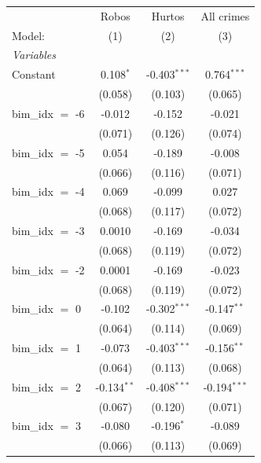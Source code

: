 
\begingroup
\centering
\begin{tabular}{lccc}
   \tabularnewline \midrule \midrule
                       & Robos          & Hurtos         & All crimes \\   
   Model:              & (1)            & (2)            & (3)\\  
   \midrule
   \emph{Variables}\\
   Constant            & 0.108$^{*}$    & -0.403$^{***}$ & 0.764$^{***}$\\   
                       & (0.058)        & (0.103)        & (0.065)\\   
   bim\_idx $=$ -6     & -0.012         & -0.152         & -0.021\\   
                       & (0.071)        & (0.126)        & (0.074)\\   
   bim\_idx $=$ -5     & 0.054          & -0.189         & -0.008\\   
                       & (0.066)        & (0.116)        & (0.071)\\   
   bim\_idx $=$ -4     & 0.069          & -0.099         & 0.027\\   
                       & (0.068)        & (0.117)        & (0.072)\\   
   bim\_idx $=$ -3     & 0.0010         & -0.169         & -0.034\\   
                       & (0.068)        & (0.119)        & (0.072)\\   
   bim\_idx $=$ -2     & 0.0001         & -0.169         & -0.023\\   
                       & (0.068)        & (0.119)        & (0.072)\\   
   bim\_idx $=$ 0      & -0.102         & -0.302$^{***}$ & -0.147$^{**}$\\   
                       & (0.064)        & (0.114)        & (0.069)\\   
   bim\_idx $=$ 1      & -0.073         & -0.403$^{***}$ & -0.156$^{**}$\\   
                       & (0.064)        & (0.113)        & (0.068)\\   
   bim\_idx $=$ 2      & -0.134$^{**}$  & -0.408$^{***}$ & -0.194$^{***}$\\   
                       & (0.067)        & (0.120)        & (0.071)\\   
   bim\_idx $=$ 3      & -0.080         & -0.196$^{*}$   & -0.089\\   
                       & (0.066)        & (0.113)        & (0.069)\\   

\end{tabular}
